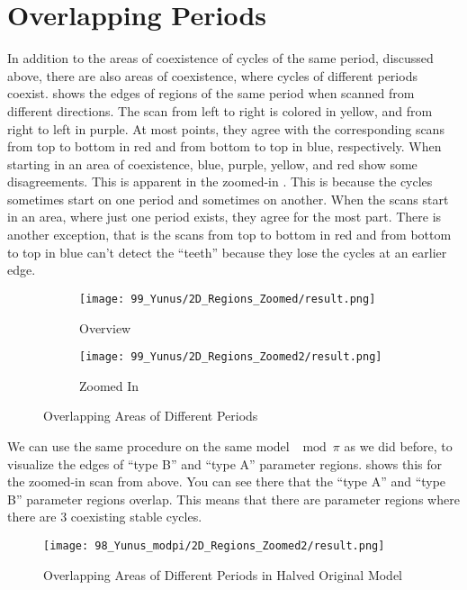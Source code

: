 \section{Overlapping Periods}

In addition to the areas of coexistence of cycles of the same period, discussed above, there are also areas of coexistence, where cycles of different periods coexist.
 shows the edges of regions of the same period when scanned from different directions.
The scan from left to right is colored in yellow, and from right to left in purple.
At most points, they agree with the corresponding scans from top to bottom in red and from bottom to top in blue, respectively.
When starting in an area of coexistence, blue, purple, yellow, and red show some disagreements.
This is apparent in the zoomed-in .
This is because the cycles sometimes start on one period and sometimes on another.
When the scans start in an area, where just one period exists, they agree for the most part.
There is another exception, that is the scans from top to bottom in red and from bottom to top in blue can't detect the ``teeth'' because they lose the cycles at an earlier edge.

\begin{figure}
    \centering
    \begin{subfigure}{0.4\textwidth}
        \texttt{[image: 99\_Yunus/2D\_Regions\_Zoomed/result.png]}
        \caption{Overview}
        \label{fig:yunus.period.regions}
    \end{subfigure}
    \begin{subfigure}{0.4\textwidth}
        \texttt{[image: 99\_Yunus/2D\_Regions\_Zoomed2/result.png]}
        \caption{Zoomed In}
        \label{fig:yunus.period.regions.zoomed}
    \end{subfigure}
    \caption{Overlapping Areas of Different Periods}
\end{figure}

We can use the same procedure on the same model $\mod \pi$ as we did before, to visualize the edges of ``type B'' and ``type A'' parameter regions.
 shows this for the zoomed-in scan from above.
You can see there that the ``type A'' and ``type B'' parameter regions overlap.
This means that there are parameter regions where there are 3 coexisting stable cycles.

\begin{figure}
    \centering
    \texttt{[image: 98\_Yunus\_modpi/2D\_Regions\_Zoomed2/result.png]}
    \caption{Overlapping Areas of Different Periods in Halved Original Model}
    \label{fig:yunus.halved.period.regions.zoomed}
\end{figure}
